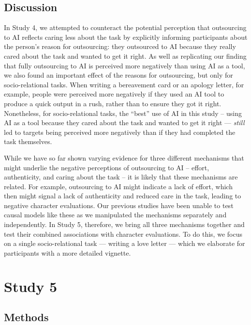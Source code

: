 \documentclass[
  man,
  floatsintext,
  longtable,
  nolmodern,
  notxfonts,
  notimes,
  colorlinks=true,linkcolor=blue,citecolor=blue,urlcolor=blue]{apa7}
\begin{document}
\subsection*{Discussion}\label{discussion-3}

In Study 4, we attempted to counteract the potential perception that
outsourcing to AI reflects caring less about the task by explicitly
informing participants about the person's reason for outsourcing: they
outsourced to AI because they really cared about the task and wanted to
get it right. As well as replicating our finding that fully outsourcing
to AI is perceived more negatively than using AI as a tool, we also
found an important effect of the reasons for outsourcing, but only for
socio-relational tasks. When writing a bereavement card or an apology
letter, for example, people were perceived more negatively if they used
an AI tool to produce a quick output in a rush, rather than to ensure
they got it right. Nonetheless, for socio-relational tasks, the ``best''
use of AI in this study -- using AI as a tool because they cared about
the task and wanted to get it right --- \emph{still} led to targets
being perceived more negatively than if they had completed the task
themselves.

While we have so far shown varying evidence for three different
mechanisms that might underlie the negative perceptions of outsourcing
to AI -- effort, authenticity, and caring about the task -- it is likely
that these mechanisms are related. For example, outsourcing to AI might
indicate a lack of effort, which then might signal a lack of
authenticity and reduced care in the task, leading to negative character
evaluations. Our previous studies have been unable to test causal models
like these as we manipulated the mechanisms separately and
independently. In Study 5, therefore, we bring all three mechanisms
together and test their combined associations with character
evaluations. To do this, we focus on a single socio-relational task ---
writing a love letter --- which we elaborate for participants with a
more detailed vignette.

\section*{Study 5}\label{study-5}

\subsection*{Methods}\label{methods-4}
\end{document}
